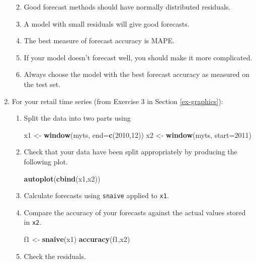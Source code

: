 \documentclass[]{book}
\newenvironment{Shaded}{\begin{snugshade}}{\end{snugshade}}
\newcommand{\DataTypeTok}[1]{\textcolor[rgb]{0.13,0.29,0.53}{#1}}
\newcommand{\DecValTok}[1]{\textcolor[rgb]{0.00,0.00,0.81}{#1}}
\newcommand{\KeywordTok}[1]{\textcolor[rgb]{0.13,0.29,0.53}{\textbf{#1}}}
\newcommand{\NormalTok}[1]{#1}
\newcommand{\StringTok}[1]{\textcolor[rgb]{0.31,0.60,0.02}{#1}}
\providecommand{\tightlist}{%
  \setlength{\itemsep}{0pt}\setlength{\parskip}{0pt}}
\begin{document}
\begin{enumerate}
  \begin{enumerate}
  \def\labelenumii{\alph{enumii}.}
  \tightlist
  \item
    Good forecast methods should have normally distributed residuals.
  \item
    A model with small residuals will give good forecasts.
  \item
    The best measure of forecast accuracy is MAPE.
  \item
    If your model doesn't forecast well, you should make it more complicated.
  \item
    Always choose the model with the best forecast accuracy as measured on the test set.
  \end{enumerate}
\item
  For your retail time series (from Exercise 3 in Section \ref{ex-graphics}):

  \begin{enumerate}
  \def\labelenumii{\alph{enumii}.}
  \item
    Split the data into two parts using

\begin{Shaded}
\begin{Highlighting}[]
\NormalTok{x1 <-}\StringTok{ }\KeywordTok{window}\NormalTok{(myts, }\DataTypeTok{end=}\KeywordTok{c}\NormalTok{(}\DecValTok{2010}\NormalTok{,}\DecValTok{12}\NormalTok{))}
\NormalTok{x2 <-}\StringTok{ }\KeywordTok{window}\NormalTok{(myts, }\DataTypeTok{start=}\DecValTok{2011}\NormalTok{)}
\end{Highlighting}
\end{Shaded}
  \item
    Check that your data have been split appropriately by producing the following plot.

\begin{Shaded}
\begin{Highlighting}[]
\KeywordTok{autoplot}\NormalTok{(}\KeywordTok{cbind}\NormalTok{(x1,x2))}
\end{Highlighting}
\end{Shaded}
  \item
    Calculate forecasts using \texttt{snaive} applied to \texttt{x1}.
  \item
    Compare the accuracy of your forecasts against the actual values stored in \texttt{x2}.

\begin{Shaded}
\begin{Highlighting}[]
\NormalTok{f1 <-}\StringTok{ }\KeywordTok{snaive}\NormalTok{(x1)}
\KeywordTok{accuracy}\NormalTok{(f1,x2)}
\end{Highlighting}
\end{Shaded}
  \item
    Check the residuals.


\end{enumerate}
\end{enumerate}
\end{document}
